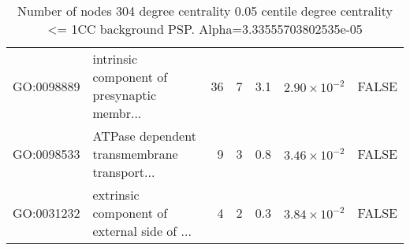 \begin{table}[ht]
\begin{adjustbox}{max width=\textwidth}
\begin{tabular}{llrrrrl}
  GO:0098889 & intrinsic component of presynaptic membr... & 36 & 7 & 3.1 & $2.90 \times 10^{-2}$ & FALSE \\ 
  GO:0098533 & ATPase dependent transmembrane transport... & 9 & 3 & 0.8 & $3.46 \times 10^{-2}$ & FALSE \\ 
  GO:0031232 & extrinsic component of external side of ... & 4 & 2 & 0.3 & $3.84 \times 10^{-2}$ & FALSE \\ 
   \hline
\end{tabular}
\end{adjustbox}
\caption{Number of nodes 304 degree centrality 0.05 centile  degree centrality <= 1CC background PSP. Alpha=3.33555703802535e-05} 
\label{tab:Number of nodes 304 degree centrality 0.05 centile  degree centrality <= 1CC background PSP. Alpha=3.33555703802535e-05}
\end{table}



